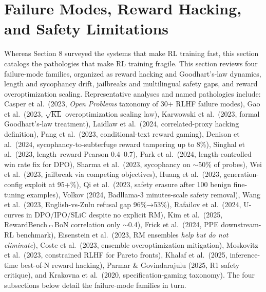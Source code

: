 \documentclass{article}
\begin{document}
\section{Failure Modes, Reward Hacking, and Safety Limitations}\label{failure-modes-reward-hacking-and-safety-limitations}

Whereas Section 8 surveyed the systems that make RL training fast, this section catalogs the pathologies that make RL training fragile. This section reviews four failure-mode families, organized as reward hacking and Goodhart's-law dynamics, length and sycophancy drift, jailbreaks and multilingual safety gaps, and reward overoptimization scaling. Representative analyses and named pathologies include: Casper et al.~(2023, \emph{Open Problems} taxonomy of 30+ RLHF failure modes), Gao et al.~(2023, \(\sqrt{\mathrm{KL}}\) overoptimization scaling law), Karwowski et al.~(2023, formal Goodhart's-law treatment), Laidlaw et al.~(2024, correlated-proxy hacking definition), Pang et al.~(2023, conditional-text reward gaming), Denison et al.~(2024, sycophancy-to-subterfuge reward tampering up to 8\%), Singhal et al.~(2023, length--reward Pearson 0.4--0.7), Park et al.~(2024, length-controlled win rate fix for DPO), Sharma et al.~(2023, sycophancy on $\sim$50\% of probes), Wei et al.~(2023, jailbreak via competing objectives), Huang et al.~(2023, generation-config exploit at 95+\%), Qi et al.~(2023, safety erasure after 100 benign fine-tuning examples), Volkov (2024, Badllama-3 minutes-scale safety removal), Wang et al.~(2023, English-vs-Zulu refusal gap 96\%→53\%), Rafailov et al.~(2024, U-curves in DPO/IPO/SLiC despite no explicit RM), Kim et al.~(2025, RewardBench↔BoN correlation only $\sim$0.4), Frick et al.~(2024, PPE downstream-RL benchmark), Eisenstein et al.~(2023, RM ensembles \emph{help but do not eliminate}), Coste et al.~(2023, ensemble overoptimization mitigation), Moskovitz et al.~(2023, constrained RLHF for Pareto fronts), Khalaf et al.~(2025, inference-time best-of-N reward hacking), Parmar \& Govindarajulu (2025, R1 safety critique), and Krakovna et al.~(2020, specification-gaming taxonomy). The four subsections below detail the failure-mode families in turn.
\end{document}
